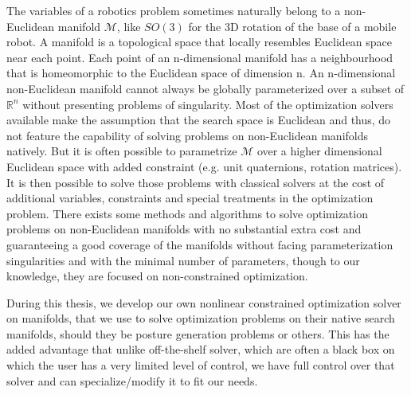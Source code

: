 The variables of a robotics problem sometimes naturally belong to a non-Euclidean manifold $\mathcal{M}$, like $SO(3)$ for the 3D rotation of the base of a mobile robot.
A manifold is a topological space that locally resembles Euclidean space near each point.
Each point of an n-dimensional manifold has a neighbourhood that is homeomorphic to the Euclidean space of dimension n.
An n-dimensional non-Euclidean manifold cannot always be globally parameterized over a subset of $\mathbb{R}^n$ without presenting problems of singularity.
Most of the optimization solvers available make the assumption that the search space is Euclidean and thus, do not feature the capability of solving problems on non-Euclidean manifolds natively.
But it is often possible to parametrize $\mathcal{M}$ over a higher dimensional Euclidean space with added constraint (e.g. unit quaternions, rotation matrices).
It is then possible to solve those problems with classical solvers at the cost of additional variables, constraints and special treatments in the optimization problem.
There exists some methods and algorithms to solve optimization problems on non-Euclidean manifolds with no substantial extra cost and guaranteeing a good coverage of the manifolds without facing parameterization singularities and with the minimal number of parameters, though to our knowledge, they are focused on non-constrained optimization.

During this thesis, we develop our own nonlinear constrained optimization solver on manifolds, that we use to solve optimization problems on their native search manifolds, should they be posture generation problems or others.
This has the added advantage that unlike off-the-shelf solver, which are often a black box on which the user has a very limited level of control, we have full control over that solver and can specialize/modify it to fit our needs.


